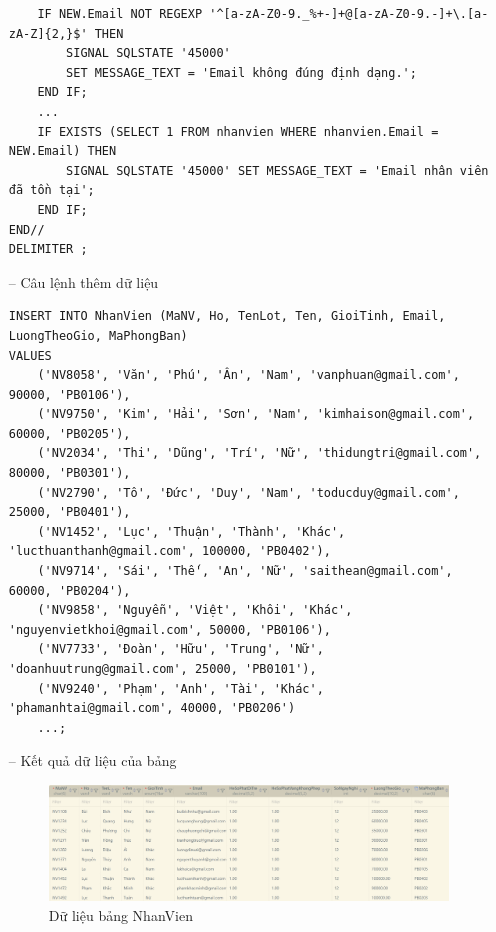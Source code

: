 \begin{itemize}
\begin{verbatim}
    IF NEW.Email NOT REGEXP '^[a-zA-Z0-9._%+-]+@[a-zA-Z0-9.-]+\.[a-zA-Z]{2,}$' THEN
        SIGNAL SQLSTATE '45000' 
        SET MESSAGE_TEXT = 'Email không đúng định dạng.';
    END IF;
    ...
    IF EXISTS (SELECT 1 FROM nhanvien WHERE nhanvien.Email = NEW.Email) THEN 
        SIGNAL SQLSTATE '45000' SET MESSAGE_TEXT = 'Email nhân viên đã tồn tại';
    END IF;
END//
DELIMITER ;
    \end{verbatim}
    \newpage
    \item [--] Câu lệnh thêm dữ liệu
   \begin{verbatim}
INSERT INTO NhanVien (MaNV, Ho, TenLot, Ten, GioiTinh, Email, LuongTheoGio, MaPhongBan)
VALUES
    ('NV8058', 'Văn', 'Phú', 'Ân', 'Nam', 'vanphuan@gmail.com', 90000, 'PB0106'),
    ('NV9750', 'Kim', 'Hải', 'Sơn', 'Nam', 'kimhaison@gmail.com', 60000, 'PB0205'),
    ('NV2034', 'Thi', 'Dũng', 'Trí', 'Nữ', 'thidungtri@gmail.com', 80000, 'PB0301'),
    ('NV2790', 'Tô', 'Đức', 'Duy', 'Nam', 'toducduy@gmail.com', 25000, 'PB0401'),
    ('NV1452', 'Lục', 'Thuận', 'Thành', 'Khác', 'lucthuanthanh@gmail.com', 100000, 'PB0402'),
    ('NV9714', 'Sái', 'Thế', 'An', 'Nữ', 'saithean@gmail.com', 60000, 'PB0204'),
    ('NV9858', 'Nguyễn', 'Việt', 'Khôi', 'Khác', 'nguyenvietkhoi@gmail.com', 50000, 'PB0106'),
    ('NV7733', 'Đoàn', 'Hữu', 'Trung', 'Nữ', 'doanhuutrung@gmail.com', 25000, 'PB0101'),
    ('NV9240', 'Phạm', 'Anh', 'Tài', 'Khác', 'phamanhtai@gmail.com', 40000, 'PB0206')
    ...;
    \end{verbatim}
    \item [--] Kết quả dữ liệu của bảng
    \begin{figure}[H]
        \centering
        \includegraphics[width=\linewidth]{content/images/data_nhanvien.png}
        \caption{Dữ liệu bảng NhanVien}
        \label{fig:data_nhanvien}
    \end{figure}
\end{itemize}
\newpage
